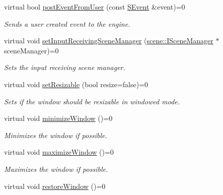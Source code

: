 \begin{DoxyCompactItemize}
virtual bool \hyperlink{classirr_1_1IrrlichtDevice_abf859e39f017b0403c6ed331e48e01df}{post\+Event\+From\+User} (const \hyperlink{structirr_1_1SEvent}{S\+Event} \&event)=0
\begin{DoxyCompactList}\small\item\em Sends a user created event to the engine. \end{DoxyCompactList}\item 
virtual void \hyperlink{classirr_1_1IrrlichtDevice_a22ab84f23050dbef122f16a33aa9b91d}{set\+Input\+Receiving\+Scene\+Manager} (\hyperlink{classirr_1_1scene_1_1ISceneManager}{scene\+::\+I\+Scene\+Manager} $\ast$scene\+Manager)=0
\begin{DoxyCompactList}\small\item\em Sets the input receiving scene manager. \end{DoxyCompactList}\item 
virtual void \hyperlink{classirr_1_1IrrlichtDevice_a4911502bd085d2d87474ff12959bc341}{set\+Resizable} (bool resize=false)=0
\begin{DoxyCompactList}\small\item\em Sets if the window should be resizable in windowed mode. \end{DoxyCompactList}\item 
virtual void \hyperlink{classirr_1_1IrrlichtDevice_a23e31ff31f564d5e715edc901e519311}{minimize\+Window} ()=0\hypertarget{classirr_1_1IrrlichtDevice_a23e31ff31f564d5e715edc901e519311}{}\label{classirr_1_1IrrlichtDevice_a23e31ff31f564d5e715edc901e519311}

\begin{DoxyCompactList}\small\item\em Minimizes the window if possible. \end{DoxyCompactList}\item 
virtual void \hyperlink{classirr_1_1IrrlichtDevice_a24cb8ac97c16114ff7df1f0ec604a219}{maximize\+Window} ()=0\hypertarget{classirr_1_1IrrlichtDevice_a24cb8ac97c16114ff7df1f0ec604a219}{}\label{classirr_1_1IrrlichtDevice_a24cb8ac97c16114ff7df1f0ec604a219}

\begin{DoxyCompactList}\small\item\em Maximizes the window if possible. \end{DoxyCompactList}\item 
virtual void \hyperlink{classirr_1_1IrrlichtDevice_a4a92974b424cc612198505e31fe125d3}{restore\+Window} ()=0\hypertarget{classirr_1_1IrrlichtDevice_a4a92974b424cc612198505e31fe125d3}{}\label{classirr_1_1IrrlichtDevice_a4a92974b424cc612198505e31fe125d3}


\end{DoxyCompactItemize}

